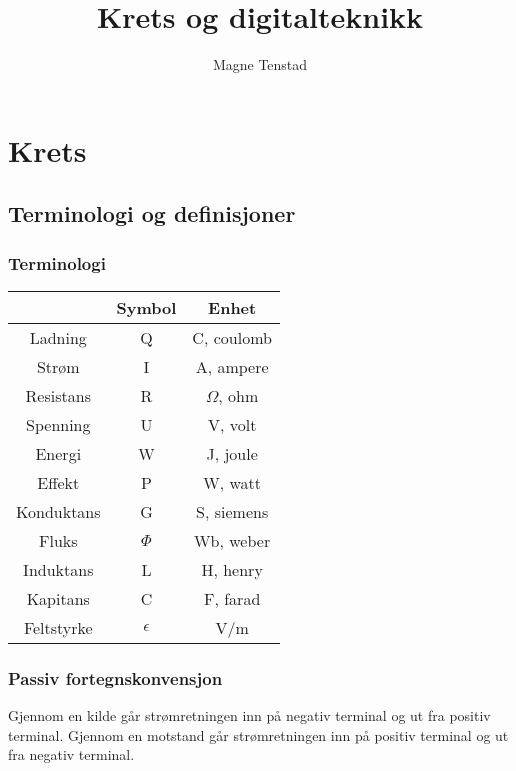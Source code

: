 \documentclass{article}
\title{Krets og digitalteknikk}
\author{Magne Tenstad}
\begin{document}
\maketitle

\clearpage

\tableofcontents

\clearpage

\section{Krets}


\subsection{Terminologi og definisjoner}


\subsubsection{Terminologi}
\begin{table}[h]
    \centering
    \begin{tabular}{c|c|c}
                    & Symbol & Enhet \\
        \hline
        Ladning     & Q & C, coulomb \\
        Strøm       & I & A, ampere \\
        Resistans   & R & $\Omega$, ohm \\
        Spenning    & U & V, volt \\
        Energi      & W & J, joule \\
        Effekt      & P & W, watt \\
        Konduktans  & G & S, siemens \\
        Fluks       & $\Phi$ & Wb, weber \\
        Induktans   & L & H, henry \\
        Kapitans    & C & F, farad \\
        Feltstyrke  & $\epsilon$ & V/m
    \end{tabular}
\end{table}


\subsubsection{Passiv fortegnskonvensjon}
Gjennom en kilde går strømretningen inn på negativ terminal og ut fra positiv terminal. Gjennom en motstand går strømretningen inn på positiv terminal og ut fra negativ terminal.
\end{document}
